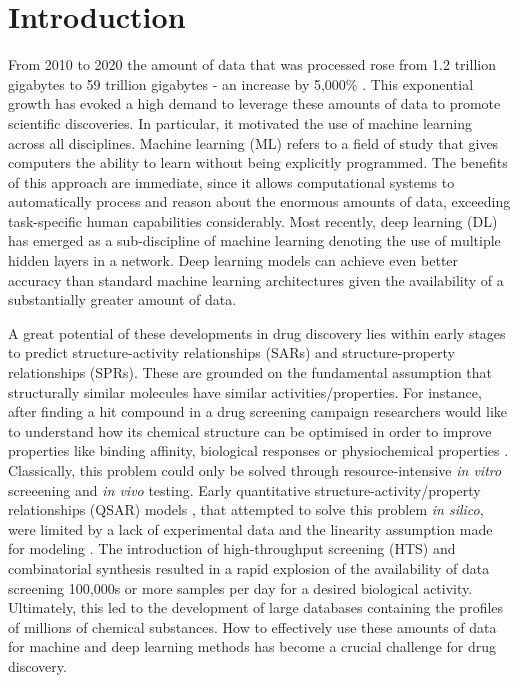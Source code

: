 \section{Introduction}
From 2010 to 2020 the amount of data that was processed rose from 1.2 trillion gigabytes to 59 trillion gigabytes - an increase by 5,000\% \citep{data}. This exponential growth has evoked a high demand to leverage these amounts of data to promote scientific discoveries. In particular, it motivated the use of machine learning across all disciplines. Machine learning (ML) refers to a field of study that gives computers the ability to learn without being explicitly programmed. The benefits of this approach are immediate, since it allows computational systems to automatically process and reason about the enormous amounts of data, exceeding task-specific human capabilities considerably. 
Most recently, deep learning (DL) has emerged as a sub-discipline of machine learning denoting the use of multiple hidden layers in a network. Deep learning models can achieve even better accuracy than standard machine learning architectures given the availability of a substantially greater amount of data.

A great potential of these developments in drug discovery lies within early stages to predict structure-activity relationships (SARs) and structure-property relationships (SPRs). These are grounded on the fundamental assumption that structurally similar molecules have similar activities/properties. For instance, after finding a hit compound in a drug screening campaign researchers would like to understand how its chemical structure can be optimised in order to improve properties like binding affinity, biological responses or physiochemical properties \citep{LO20181538}. Classically, this problem could only be solved through resource-intensive \emph{in vitro} screeening and \emph{in vivo} testing. Early quantitative structure-activity/property relationships (QSAR) models \citep{hansch}, that attempted to solve this problem \emph{in silico}, were limited by a lack of experimental data and the linearity assumption made for modeling \citep{LO20181538}.
The introduction of high-throughput screening (HTS) and combinatorial synthesis resulted in a rapid explosion of the availability of data screening 100,000s or more samples per day for a desired biological activity. Ultimately, this led to the development of large databases containing the profiles of millions of chemical substances. How to effectively use these amounts of data for machine and deep learning methods has become a crucial challenge for drug discovery.

